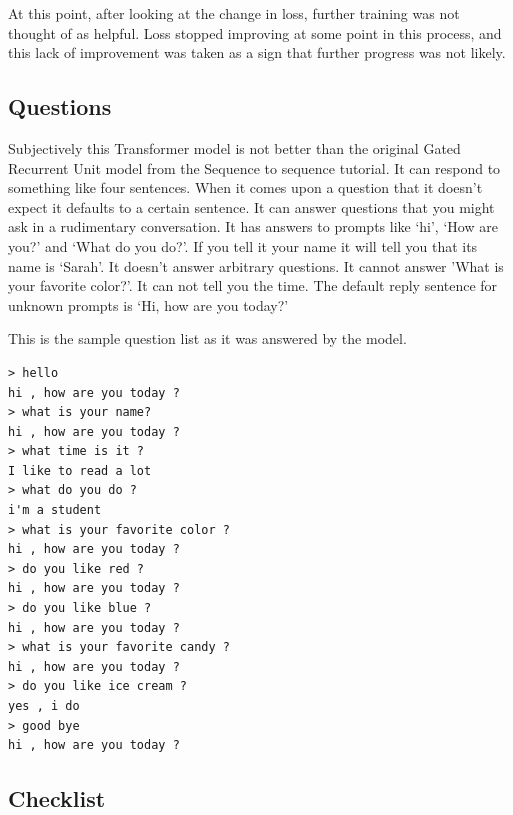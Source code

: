 At this point, after looking at the change in loss, further training was not thought of as helpful. Loss stopped improving at some point in this process, and this lack of improvement was taken as a sign that further progress was not likely.

\subsection{Questions}
Subjectively this Transformer model is not better than the original Gated Recurrent Unit model from the Sequence to sequence tutorial. It can respond to something like four sentences. When it comes upon a question that it doesn't expect it defaults to a certain sentence. It can answer questions that you might ask in a rudimentary conversation. It has answers to prompts like `hi', `How are you?' and `What do you do?'. If you tell it your name it will tell you that its name is `Sarah'. It doesn't answer arbitrary questions. It cannot answer 'What is your favorite color?'. It can not tell you the time. The default reply sentence for unknown prompts is `Hi, how are you today?'

This is the sample question list as it was answered by the model.

\begin{verbatim}
> hello
hi , how are you today ?
> what is your name?
hi , how are you today ?
> what time is it ?
I like to read a lot
> what do you do ?
i'm a student
> what is your favorite color ?
hi , how are you today ?
> do you like red ?
hi , how are you today ?
> do you like blue ?
hi , how are you today ?
> what is your favorite candy ?
hi , how are you today ?
> do you like ice cream ?
yes , i do 
> good bye
hi , how are you today ?
\end{verbatim}

\subsection{Checklist}

